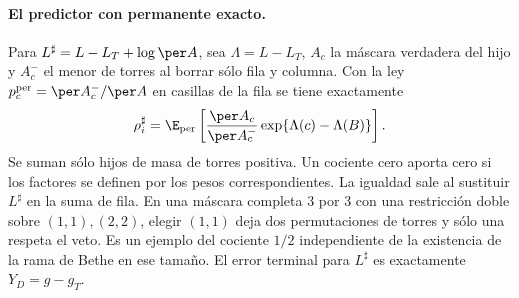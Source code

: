 \paragraph{El predictor con permanente exacto.}
Para $L^\sharp=L-L_T+\log\per A$, sea $\Lambda=L-L_T$, $A_c$ la máscara verdadera
del hijo y $A^-_c$ el menor de torres al borrar sólo fila y columna. Con la ley
$p^{\rm per}_c=\per A^-_c/\per A$ en casillas de la fila se tiene exactamente
\[
 \rho_i^\sharp=\E_{\rm per}
 \left[\frac{\per A_c}{\per A^-_c}\exp\{\Lambda(c)-\Lambda(B)\}\right].
\]
Se suman sólo hijos de masa de torres positiva. Un cociente cero aporta cero
si los factores se definen por los pesos correspondientes. La igualdad sale al
sustituir $L^\sharp$ en la suma de fila. En una máscara completa $3$ por $3$ con
una restricción doble sobre $(1,1),(2,2)$, elegir $(1,1)$ deja dos permutaciones
de torres y sólo una respeta el veto. Es un ejemplo del cociente $1/2$
independiente de la existencia de la rama de Bethe en ese tamaño.
El error terminal para $L^\sharp$ es exactamente $Y_D=g-g_T$.
